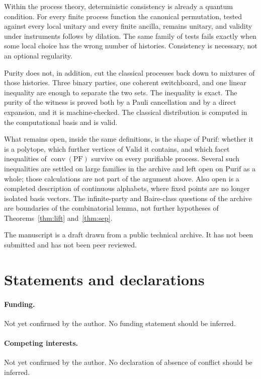 \documentclass[11pt]{article}
\theoremstyle{definition}
\theoremstyle{remark}
\newcommand{\conv}{\operatorname{conv}}
\newcommand{\PF}{\mathrm{PF}}
\newcommand{\Purif}{\mathrm{Purif}}
\newcommand{\Valid}{\mathrm{Valid}}
\begin{document}
Within the process theory, deterministic consistency is already a quantum condition. For every finite process function the canonical permutation, tested against every local unitary and every finite ancilla, remains unitary, and validity under instruments follows by dilation. The same family of tests fails exactly when some local choice has the wrong number of histories. Consistency is necessary, not an optional regularity.

Purity does not, in addition, cut the classical processes back down to mixtures of those histories. Three binary parties, one coherent switchboard, and one linear inequality are enough to separate the two sets. The inequality is exact. The purity of the witness is proved both by a Pauli cancellation and by a direct expansion, and it is machine-checked. The classical distribution is computed in the computational basis and is valid.

What remains open, inside the same definitions, is the shape of \(\Purif\): whether it is a polytope, which further vertices of \(\Valid\) it contains, and which facet inequalities of \(\conv(\PF)\) survive on every purifiable process. Several such inequalities are settled on large families in the archive and left open on \(\Purif\) as a whole; those calculations are not part of the argument above. Also open is a completed description of continuous alphabets, where fixed points are no longer isolated basis vectors. The infinite-party and Baire-class questions of the archive are boundaries of the combinatorial lemma, not further hypotheses of Theorems~\ref{thm:lift} and~\ref{thm:sep}.

The manuscript is a draft drawn from a public technical archive. It has not been submitted and has not been peer reviewed.

\section*{Statements and declarations}

\paragraph{Funding.}
Not yet confirmed by the author. No funding statement should be inferred.

\paragraph{Competing interests.}
Not yet confirmed by the author. No declaration of absence of conflict should be inferred.
\end{document}
